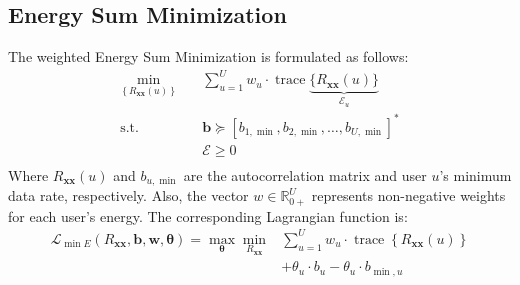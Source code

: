 \subsection{Energy Sum Minimization} \label{Esum}
The weighted Energy Sum Minimization is formulated as follows:
\begin{equation}
\begin{aligned}
\min_{\left\{R_{\boldsymbol{xx}}{(u)} \right\}} \quad & \sum_{u=1}^U w_u \cdot \operatorname{trace} \underbrace{\{R_{ \boldsymbol{x} \boldsymbol{x}}{(u)}\}}_{\mathcal{E}_u}\\
\textrm{s.t.} \quad & \mathbf{b} \succeq \left[b_{1, \min }, b_{2, \min }, \ldots, b_{U, \min }\right]^*\\
  &\mathcal{E}\geq0    \\
\end{aligned}
\end{equation}
Where $R_{\boldsymbol{xx}}(u)$ and $b_{u,\operatorname{min}}$ are the autocorrelation matrix and user $u$'s minimum data rate, respectively. Also, the vector $w \in \mathbb{R}_{0+}^U$ represents non-negative weights for each user's energy.
The corresponding Lagrangian function is:
\begin{equation}
\begin{aligned}
\mathcal{L}_{\min E}\left(R_{\boldsymbol{x} \boldsymbol{x}}, \boldsymbol{b}, \boldsymbol{w}, \boldsymbol{\theta}\right)=\max _{\boldsymbol{\theta}} \min _{R_{\boldsymbol{x} \boldsymbol{x}}} &\sum_{u=1}^U  w_u \cdot \operatorname{trace}\left\{R_{\boldsymbol{x} \boldsymbol{x}}(u)\right\}\\ &+ \theta_u \cdot b_u-\theta_u \cdot b_{\min , u}
\end{aligned}
\end{equation}
